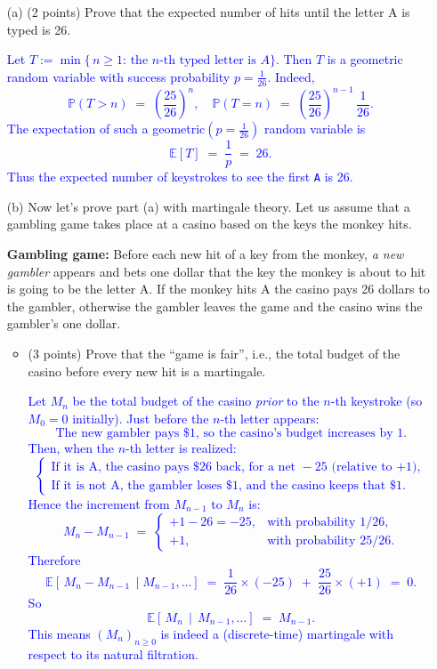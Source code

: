 \documentclass{article}
\begin{document}
\begin{enumerate}
    \item[(a)] (2 points) Prove that the expected number of hits until the letter A is typed is 26.

        \textcolor{blue}{
            Let $T := \min\{\,n \ge 1:\, \text{the }n\text{-th typed letter is }A\}$. Then $T$ is a geometric random variable with success probability $p=\tfrac{1}{26}$. Indeed,
\[
\mathbb{P}(T > n) \;=\; \left(\frac{25}{26}\right)^n,
\quad
\mathbb{P}(T=n) \;=\; \left(\frac{25}{26}\right)^{n-1}\,\frac{1}{26}.
\]
The expectation of such a geometric$(p=\tfrac{1}{26})$ random variable is
\[
\mathbb{E}[T] \;=\; \frac{1}{p} 
\;=\; 26.
\]
Thus the expected number of keystrokes to see the first \texttt{A} is 26.
        }
    
    \item[(b)] Now let’s prove part (a) with martingale theory. Let us assume that a gambling game takes place at a casino based on the keys the monkey hits.
    
    \textbf{Gambling game:} Before each new hit of a key from the monkey, \textit{a new gambler} appears and bets one dollar that the key the monkey is about to hit is going to be the letter A. If the monkey hits A the casino pays 26 dollars to the gambler, otherwise the gambler leaves the game and the casino wins the gambler’s one dollar.
    \begin{itemize}
        \item (3 points) Prove that the ``game is fair'', i.e., the total budget of the casino before every new hit is a martingale.

    \textcolor{blue}{
        Let $M_n$ be the total budget of the casino \emph{prior} to the $n$-th keystroke (so $M_0=0$ initially). Just before the $n$-th letter appears:
\[
\text{The new gambler pays \$1, so the casino's budget increases by 1.}
\]
Then, when the $n$-th letter is realized:
\[
\begin{cases}
\text{If it is A, the casino pays \$26 back, for a net } -25 \text{ (relative to +1)},\\
\text{If it is not A, the gambler loses \$1, and the casino keeps that \$1.}
\end{cases}
\]
Hence the increment from $M_{n-1}$ to $M_n$ is:
\[
M_n - M_{n-1} \;=\;
\begin{cases}
+1 - 26 = -25, & \text{with probability } 1/26,\\
+1, & \text{with probability } 25/26.
\end{cases}
\]
Therefore
\[
\mathbb{E}[\,M_n - M_{n-1}\,\mid M_{n-1},\dots]
\;=\;
\frac{1}{26}\times(-25) \;+\; \frac{25}{26}\times (+1)
\;=\; 0.
\]
So 
\[
\mathbb{E}[\,M_n \,\mid\, M_{n-1},\ldots]\;=\;M_{n-1}.
\]
This means $(M_n)_{n\ge0}$ is indeed a (discrete-time) martingale with respect to its natural filtration.
    }


\end{itemize}
\end{enumerate}
\end{document}
